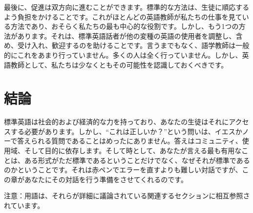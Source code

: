 最後に、促進は双方向に進むことができます。標準的な方法は、生徒に順応するよう負担をかけることです。これがほとんどの英語教師が私たちの仕事を見ている方法であり、おそらく私たちの最も中心的な役割です。しかし、もう1つの方法があります。それは、標準英語話者が他の変種の英語の使用者を調整し、含め、受け入れ、歓迎するのを助けることです。言うまでもなく、語学教師は一般的にこれをあまり行っていません。多くの人は全く行っていません。しかし、英語教師として、私たちは少なくともその可能性を認識しておくべきです。

\section{結論}

標準英語は社会的および経済的な力を持っており、あなたの生徒はそれにアクセスする必要があります。しかし、\enquote{これは正しいか？}という問いは、イエスかノーで答えられる質問であることはめったにありません。答えはコミュニティ、使用域、そして目的に依存します。そして時として、あなたが言える最も有用なことは、ある形式がただ標準であるということだけでなく、なぜそれが標準であるのかということです。それは赤ペンでエラーを直すよりも難しい対話ですが、この章があなたにその対話を行う準備をさせてくれるのです。



\noindent 注意：用語は、それらが詳細に議論されている関連するセクションに相互参照されています。



